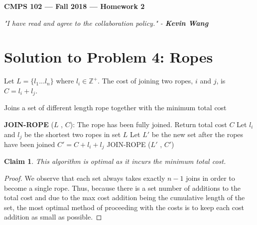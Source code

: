 \documentclass[11pt]{article}
\theoremstyle{definition}
\theoremstyle{plain}
\newtheorem{claim}{Claim}
\theoremstyle{indented-remark}
\theoremstyle{indented-proof}
\begin{document}
\begin{center}
{\bf\Large CMPS 102 --- Fall 2018 ---  Homework 2}
\end{center}

\begin{center}
\textit{"I have read and agree to the collaboration policy." - \textbf{Kevin Wang}}
\end{center}

\section*{Solution to Problem 4: Ropes}

Let $L = \{ l_{1} ... l_{n} \}$ where $l_{i} \in \mathbb{Z}^{+}$. The cost of joining two ropes, $i$ and $j$, is $C=l_{i}+l_{j}$. 

\begin{algorithm}
\caption{Joins a set of different length rope together with the minimum total cost}
\begin{algorithmic} 
\STATE \textbf{JOIN-ROPE} ($L$ , $C$):
\STATE The rope has been fully joined. Return total cost $C$
\ELSE [$|L|>1$]
\STATE Let $l_{i}$ and $l_{j}$ be the shortest two ropes in set $L$
\STATE Let $L'$ be the new set after the ropes have been joined
\STATE $C' = C + l_{i} + l_{j}$
\STATE JOIN-ROPE ($L'$ , $C'$)
\ENDIF
\end{algorithmic}
\end{algorithm}

\begin{claim}
This algorithm is optimal as it incurs the minimum total cost.
\end{claim}

\begin{proof}
We observe that each set always takes exactly $n-1$ joins in order to become a single rope. Thus, because there is a set number of additions to the total cost and due to the max cost addition being the cumulative length of the set, the most optimal method of proceeding with the costs is to keep each cost addition as small as possible.  
\end{proof}
\end{document}
